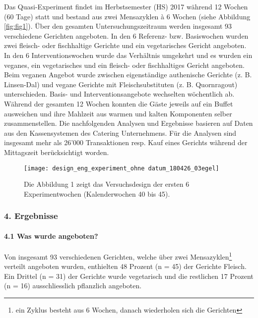 \documentclass[12pt,ngerman,]{article}
\let\oldparagraph\paragraph
\renewcommand{\paragraph}[1]{\oldparagraph{#1}\mbox{}}
\let\rmarkdownfootnote\footnote%
\def\footnote{\protect\rmarkdownfootnote}
\begin{document}
\par

Das Quasi-Experiment findet im Herbstsemester (HS) 2017 während 12
Wochen (60 Tage) statt und bestand aus zwei Mensazyklen à 6 Wochen
(siehe Abbildung \ref{fig:fig1}). Über den gesamten
Untersuchungszeitraum werden insgesamt 93 verschiedene Gerichten
angeboten. In den 6 Referenz- bzw. Basiswochen wurden zwei fleisch- oder
fischhaltige Gerichte und ein vegetarisches Gericht angeboten. In den 6
Interventionswochen wurde das Verhältnis umgekehrt und es wurden ein
veganes, ein vegetarisches und ein fleisch- oder fischhaltiges Gericht
angeboten. Beim veganen Angebot wurde zwischen eigenständige authenische
Gerichte (z. B. Linsen-Dal) und vegane Gerichte mit Fleischsubstituten
(z. B. Quornragout) unterschieden. Basis- und Interventionsangebote
wechselten wöchentlich ab. Während der gesamten 12 Wochen konnten die
Gäste jeweils auf ein Buffet ausweichen und ihre Mahlzeit aus warmen und
kalten Komponenten selber zusammenstellen. Die nachfolgenden Analysen
und Ergebnisse basieren auf Daten aus den Kassensystemen des Catering
Unternehmens. Für die Analysen sind insgesamt mehr als 26'000
Transaktionen resp. Kauf eines Gerichts während der Mittagszeit
berücksichtigt worden.

\begin{figure}[H]

{\centering \texttt{[image: design\_eng\_experiment\_ohne datum\_180426\_03egel]} 

}

\caption{\label{fig:fig1} Die Abbildung 1 zeigt das Versuchsdesign der ersten 6 Experimentwochen (Kalenderwochen 40 bis 45).}\label{fig:unnamed-chunk-1}
\end{figure}

\newpage

\hypertarget{ergebnisse}{%
\subsubsection{4. Ergebnisse}\label{ergebnisse}}

\hypertarget{was-wurde-angeboten}{%
\paragraph{4.1 Was wurde angeboten?}\label{was-wurde-angeboten}}

Von insgesamt 93 verschiedenen Gerichten, welche über zwei
Mensazyklen\footnote{ein Zyklus besteht aus 6 Wochen, danach wiederholen
  sich die Gerichten} verteilt angeboten wurden, enthielten 48 Prozent
(n = 45) der Gerichte Fleisch. Ein Drittel (n = 31) der Gerichte wurde
vegetarisch und die restlichen 17 Prozent (n = 16) ausschliesslich
pflanzlich angeboten.
\end{document}
